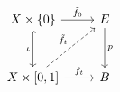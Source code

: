 \documentclass{article}
\begin{document}
    \begin{equation*}
        \begin{tikzcd}[row sep=0.4in]
            X\times\l\{0\r\} \ar[r, "\tilde{f}_0"] \ar[d, "\iota"', hookrightarrow] & E \ar[d, "p"] \\
            X\times\l[0,1\r] \ar[r, "f_t"] \ar[ur, "\tilde{f}_t", dashed] & B
        \end{tikzcd}
    \end{equation*}
\end{document}
